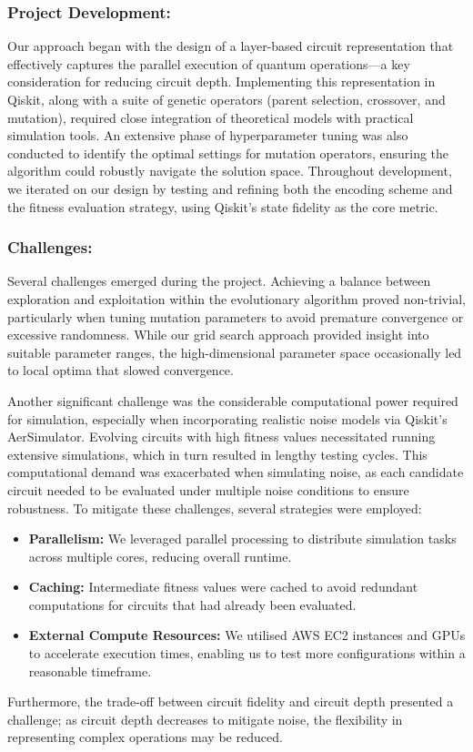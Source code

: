 \documentclass[11pt,a4paper]{article}
\begin{document}
\subsubsection*{Project Development:}  
Our approach began with the design of a layer-based circuit representation that effectively captures the parallel execution of quantum operations---a key consideration for reducing circuit depth. Implementing this representation in Qiskit, along with a suite of genetic operators (parent selection, crossover, and mutation), required close integration of theoretical models with practical simulation tools. An extensive phase of hyperparameter tuning was also conducted to identify the optimal settings for mutation operators, ensuring the algorithm could robustly navigate the solution space. Throughout development, we iterated on our design by testing and refining both the encoding scheme and the fitness evaluation strategy, using Qiskit’s state fidelity as the core metric.

\subsubsection*{Challenges:}  
Several challenges emerged during the project. Achieving a balance between exploration and exploitation within the evolutionary algorithm proved non-trivial, particularly when tuning mutation parameters to avoid premature convergence or excessive randomness. While our grid search approach provided insight into suitable parameter ranges, the high-dimensional parameter space occasionally led to local optima that slowed convergence.\newline

Another significant challenge was the considerable computational power required for simulation, especially when incorporating realistic noise models via Qiskit’s AerSimulator. Evolving circuits with high fitness values necessitated running extensive simulations, which in turn resulted in lengthy testing cycles. This computational demand was exacerbated when simulating noise, as each candidate circuit needed to be evaluated under multiple noise conditions to ensure robustness. To mitigate these challenges, several strategies were employed:
\begin{itemize}
    \item \textbf{Parallelism:} We leveraged parallel processing to distribute simulation tasks across multiple cores, reducing overall runtime.
    \item \textbf{Caching:} Intermediate fitness values were cached to avoid redundant computations for circuits that had already been evaluated.
    \item \textbf{External Compute Resources:} We utilised AWS EC2 instances and GPUs to accelerate execution times, enabling us to test more configurations within a reasonable timeframe.
\end{itemize}
Furthermore, the trade-off between circuit fidelity and circuit depth presented a challenge; as circuit depth decreases to mitigate noise, the flexibility in representing complex operations may be reduced.
\end{document}
